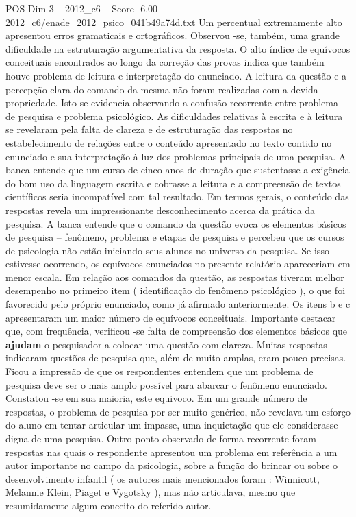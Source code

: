 \begin{textsample}{POS Dim 3 – 2012\_c6 – Score -6.00 – 2012\_c6/enade\_2012\_psico\_041b49a74d.txt}
Um percentual extremamente alto apresentou erros gramaticais e ortográficos.
Observou -se, também, uma grande dificuldade na estruturação argumentativa da resposta.
O alto índice de equívocos conceituais encontrados ao longo da correção das provas indica que também houve problema de leitura e interpretação do enunciado.
A leitura da questão e a percepção clara do comando da mesma não foram realizadas com a devida propriedade.
Isto se evidencia observando a confusão recorrente entre problema de pesquisa e problema psicológico.
As dificuldades relativas à escrita e à leitura se revelaram pela falta de clareza e de estruturação das respostas no estabelecimento de relações entre o conteúdo apresentado no texto contido no enunciado e sua interpretação à luz dos problemas principais de uma pesquisa.
A banca entende que um curso de cinco anos de duração que sustentasse a exigência do bom uso da linguagem escrita e cobrasse a leitura e a compreensão de textos científicos seria incompatível com tal resultado.
Em termos gerais, o conteúdo das respostas revela um impressionante desconhecimento acerca da prática da pesquisa.
A banca entende que o comando da questão evoca os elementos básicos de pesquisa – fenômeno, problema e etapas de pesquisa e percebeu que os cursos de psicologia não estão iniciando seus alunos no universo da pesquisa.
Se isso estivesse ocorrendo, os equívocos enunciados no presente relatório apareceriam em menor escala.
Em relação aos comandos da questão, as respostas tiveram melhor desempenho no primeiro item ( identificação do fenômeno psicológico ), o que foi favorecido pelo próprio enunciado, como já afirmado anteriormente.
Os itens b e c apresentaram um maior número de equívocos conceituais.
Importante destacar que, com frequência, verificou -se falta de compreensão dos elementos básicos que \textbf{ajudam} o pesquisador a colocar uma questão com clareza.
Muitas respostas indicaram questões de pesquisa que, além de muito amplas, eram pouco precisas.
Ficou a impressão de que os respondentes entendem que um problema de pesquisa deve ser o mais amplo possível para abarcar o fenômeno enunciado.
Constatou -se em sua maioria, este equivoco.
Em um grande número de respostas, o problema de pesquisa por ser muito genérico, não revelava um esforço do aluno em tentar articular um impasse, uma inquietação que ele considerasse digna de uma pesquisa.
Outro ponto observado de forma recorrente foram respostas nas quais o respondente apresentou um problema em referência a um autor importante no campo da psicologia, sobre a função do brincar ou sobre o desenvolvimento infantil ( os autores mais mencionados foram : Winnicott, Melannie Klein, Piaget e Vygotsky ), mas não articulava, mesmo que resumidamente algum conceito do referido autor.

\end{textsample}
